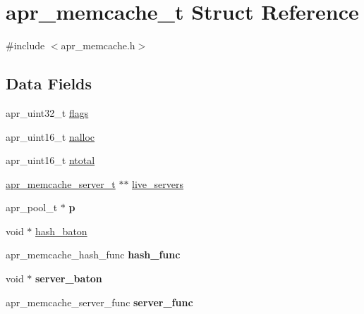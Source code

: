 \hypertarget{structapr__memcache__t}{\section{apr\-\_\-memcache\-\_\-t Struct Reference}
\label{structapr__memcache__t}
}


{\ttfamily \#include $<$apr\-\_\-memcache.\-h$>$}

\subsection*{Data Fields}
\begin{DoxyCompactItemize}
\item 
apr\-\_\-uint32\-\_\-t \hyperlink{structapr__memcache__t_aeb0639bc75fd5bc7561ab88f671f75d3}{flags}
\item 
apr\-\_\-uint16\-\_\-t \hyperlink{structapr__memcache__t_a95d15cfa5b291700cd9a697687eeac73}{nalloc}
\item 
apr\-\_\-uint16\-\_\-t \hyperlink{structapr__memcache__t_a94e1353d23d4d02a18a9f0ca0e90005d}{ntotal}
\item 
\hyperlink{structapr__memcache__server__t}{apr\-\_\-memcache\-\_\-server\-\_\-t} $\ast$$\ast$ \hyperlink{structapr__memcache__t_a85f916183d0aae6aaa88251edc7a1f81}{live\-\_\-servers}
\item 
\hypertarget{structapr__memcache__t_a5157d1b71f12ecbdf8439eca46525c87}{apr\-\_\-pool\-\_\-t $\ast$ {\bfseries p}}\label{structapr__memcache__t_a5157d1b71f12ecbdf8439eca46525c87}

\item 
void $\ast$ \hyperlink{structapr__memcache__t_a26614ee9cfdc014d7e5ea46df253193a}{hash\-\_\-baton}
\item 
\hypertarget{structapr__memcache__t_ac63433f48f39aab248e93a12109c2028}{apr\-\_\-memcache\-\_\-hash\-\_\-func {\bfseries hash\-\_\-func}}\label{structapr__memcache__t_ac63433f48f39aab248e93a12109c2028}

\item 
\hypertarget{structapr__memcache__t_aea9d227dec27ab31af244d5759c3939a}{void $\ast$ {\bfseries server\-\_\-baton}}\label{structapr__memcache__t_aea9d227dec27ab31af244d5759c3939a}

\item 
\hypertarget{structapr__memcache__t_a010fc90cc07583737ab09f958d182b8d}{apr\-\_\-memcache\-\_\-server\-\_\-func {\bfseries server\-\_\-func}}\label{structapr__memcache__t_a010fc90cc07583737ab09f958d182b8d}

\end{DoxyCompactItemize}


